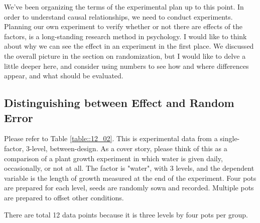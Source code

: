 \documentclass{ltjbook}
\begin{document}
We've been organizing the terms of the experimental plan up to this point. In order to understand causal relationships, we need to conduct experiments. Planning our own experiment to verify whether or not there are effects of the factors, is a long-standing research method in psychology.
I would like to think about why we can see the effect in an experiment in the first place. We discussed the overall picture in the section on randomization, but I would like to delve a little deeper here, and consider using numbers to see how and where differences appear, and what should be evaluated.

\subsection{Distinguishing between Effect and Random Error}
\label{generalLinear}
Please refer to Table \ref{table::12_02}. This is experimental data from a single-factor, 3-level, between-design. As a cover story, please think of this as a comparison of a plant growth experiment in which water is given daily, occasionally, or not at all. The factor is "water", with 3 levels, and the dependent variable is the length of growth measured at the end of the experiment. Four pots are prepared for each level, seeds are randomly sown and recorded. Multiple pots are prepared to offset other conditions.

There are total 12 data points because it is three levels by four pots per group.
\end{document}
